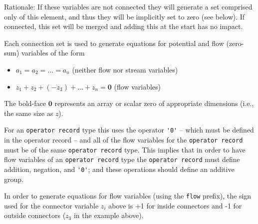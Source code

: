 \begin{nonnormative}
Rationale: If these variables are not connected they will generate a set comprised only of this element, and thus they will be implicitly set to zero (see below).
If connected, this set will be merged and adding this at the start has no impact.
\end{nonnormative}

Each connection set is used to generate equations for potential and flow (zero-sum) variables of the form
\begin{itemize}
\item
  $a_{1} = a_{2} = \ldots = a_{n}$ (neither flow nor stream variables)
\item
  $z_{1} + z_{2} + (-z_{3}) + \ldots + z_{n} = \mathbf{0}$ (flow variables)
\end{itemize}

The bold-face $\mathbf{0}$ represents an array or scalar zero of appropriate dimensions (i.e., the same size as $z$).

For an \lstinline!operator record! type this uses the operator \lstinline!'0'! -- which must be defined in the operator record -- and all of the flow variables for the \lstinline!operator record! must be of the same \lstinline!operator record! type.
This implies that in order to have flow variables of an \lstinline!operator record! type the \lstinline!operator record! must define addition, negation, and \lstinline!'0'!; and these operations should define an additive group.

In order to generate equations for flow variables (using the \lstinline!flow! prefix), the sign used for the connector variable $z_{i}$ above is +1 for inside connectors and -1 for outside connectors ($z_{3}$ in the example above).

